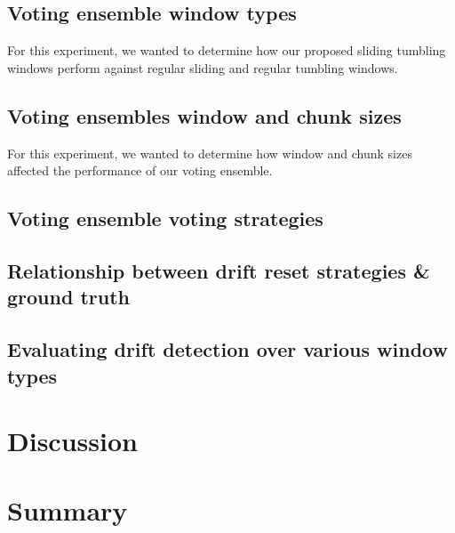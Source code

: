 \subsection{Voting ensemble window types}
For this experiment, we wanted to determine how our proposed sliding tumbling windows perform against regular sliding and regular tumbling windows.

\subsection{Voting ensembles window and chunk sizes}
For this experiment, we wanted to determine how window and chunk sizes affected the performance of our voting ensemble. 

\subsection{Voting ensemble voting strategies}


\subsection{Relationship between drift reset strategies \& ground truth}


\subsection{Evaluating drift detection over various window types}


\section{Discussion}

\section{Summary}


